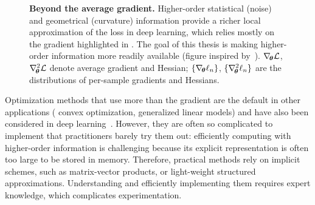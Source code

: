 \begin{figure}[!t]
  \centering
  \tikzexternalenable%
  
  \tikzexternaldisable%
  \caption{\textbf{Beyond the average gradient.} Higher-order statistical
    (noise) and geometrical (curvature) information provide a richer local
    approximation of the loss in deep learning, which relies mostly on the
    gradient highlighted in
    {\protect{}}. The goal of this thesis is making
    higher-order information
    {\protect{}} more readily available (figure inspired
    by~\cite{bottou2016machine}). $\nabla_{\!{{\bm{\theta}}}}{\mathcal{L}}$,
    $\nabla_{\!{{\bm{\theta}}}}^{2}{\mathcal{L}}$ denote average gradient and Hessian;
    $\{\nabla_{\!{{\bm{\theta}}}}\ell_n\} $, $\{\nabla_{\!{{\bm{\theta}}}}^{2}\ell_n\}$ are the
    distributions of per-sample gradients and Hessians.}\label{fig:background::higher_order_information}
\end{figure}

Optimization methods that use more than the gradient are the default in other
applications (\eg%
convex optimization, generalized linear models) and have also been considered in
deep
learning~\cite{becker1988improving,amari1998natural,martens2010deep,martens2015optimizing,zhang2017blockdiagonal,henriques2019small,gargiani2020promise,yao2021adahessian}.
However, they are often so complicated to implement that practitioners barely
try them out: efficiently computing with higher-order information is challenging
because its explicit representation is often too large to be stored in memory.
Therefore, practical methods rely on implicit schemes, such as matrix-vector
products, or light-weight structured approximations. Understanding and
efficiently implementing them requires expert knowledge, which complicates
experimentation.

